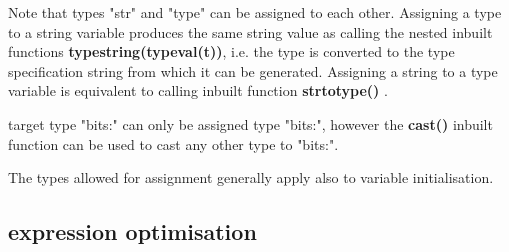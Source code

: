             Note that types "str" and "type" can be assigned to each other.
            Assigning a type to a string variable produces the same string value
            as calling the nested inbuilt functions {\bf
            typestring(typeval(t))}, i.e. the type is converted to the type
            specification string from which it can be generated. Assigning a
            string to a type variable is equivalent to calling inbuilt function
            {\bf strtotype()} .
            
            target type "bits:" can only be assigned type "bits:", however the
            {\bf cast()} inbuilt function can be used to cast any other type to "bits:".
            
            The types allowed for assignment generally apply also to variable
            initialisation.

        \subsection{expression optimisation}

